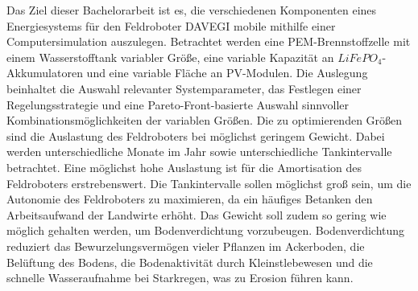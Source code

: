 Das Ziel dieser Bachelorarbeit ist es, die verschiedenen Komponenten eines Energiesystems für den Feldroboter DAVEGI mobile mithilfe einer Computersimulation auszulegen. Betrachtet werden eine PEM-Brennstoffzelle mit einem Wasserstofftank variabler Größe, eine variable Kapazität an $LiFePO_4$-Akkumulatoren und eine variable Fläche an PV-Modulen. Die Auslegung beinhaltet die Auswahl relevanter Systemparameter, das Festlegen einer Regelungsstrategie und eine Pareto-Front-basierte Auswahl sinnvoller Kombinationsmöglichkeiten der variablen Größen. Die zu optimierenden Größen sind die Auslastung des Feldroboters bei möglichst geringem Gewicht. Dabei werden unterschiedliche Monate im Jahr sowie unterschiedliche Tankintervalle betrachtet. Eine möglichst hohe Auslastung ist für die Amortisation des Feldroboters erstrebenswert. Die Tankintervalle sollen möglichst groß sein, um die Autonomie des Feldroboters zu maximieren, da ein häufiges Betanken den Arbeitsaufwand der Landwirte erhöht. Das Gewicht soll zudem so gering wie möglich gehalten werden, um Bodenverdichtung vorzubeugen. Bodenverdichtung reduziert das Bewurzelungsvermögen vieler Pflanzen im Ackerboden, die Belüftung des Bodens, die Bodenaktivität durch Kleinstlebewesen und die schnelle Wasseraufnahme bei Starkregen, was zu Erosion führen kann. \\





